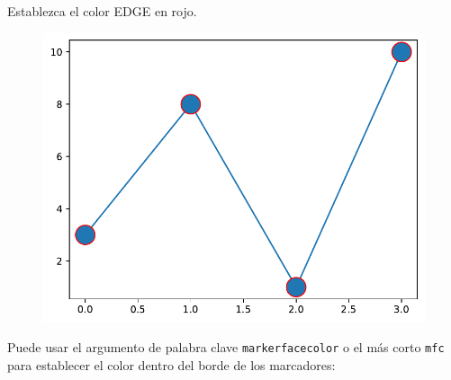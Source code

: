 \begin{code} Establezca el color EDGE en rojo.

\begin{Shaded}
\begin{Highlighting}[]

\OperatorTok{=}\NormalTok{ np.array([}\NormalTok{, }\NormalTok{, }\NormalTok{, }\NormalTok{])}

\OperatorTok{=} \OperatorTok{=} \OperatorTok{=} \NormalTok{)}
\end{Highlighting}
\end{Shaded}

\begin{figure}
  \centering
  \includegraphics[scale=0.6]{img/grafica1012.pdf}
\end{figure}

\end{code}

Puede usar el argumento de palabra clave \texttt{markerfacecolor} o el
más corto \texttt{mfc} para establecer el color dentro del borde de los
marcadores:\\

